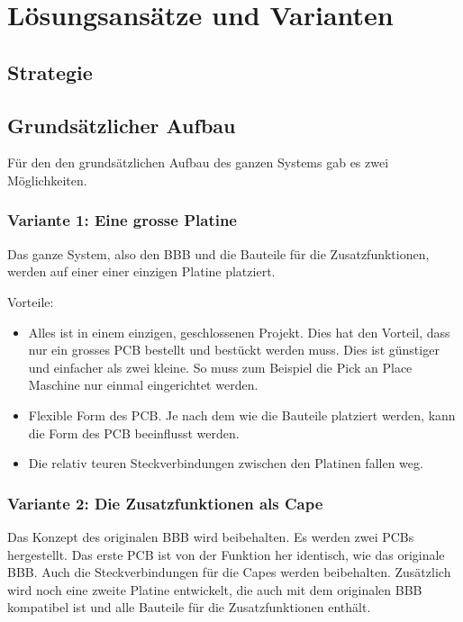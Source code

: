 \chapter{Lösungsansätze und Varianten}


\section{Strategie}



\section{Grundsätzlicher Aufbau}
Für den den grundsätzlichen Aufbau des ganzen Systems gab es zwei Möglichkeiten.

\subsection{Variante 1: Eine grosse Platine}
Das ganze System, also den BBB und die Bauteile für die Zusatzfunktionen, werden auf einer einer einzigen Platine platziert.

Vorteile:
\begin{itemize}
\item Alles ist in einem einzigen, geschlossenen Projekt. Dies hat den Vorteil, dass nur ein grosses PCB bestellt und bestückt werden muss. Dies ist günstiger und einfacher als zwei kleine. So muss zum Beispiel die Pick an Place Maschine nur einmal eingerichtet werden.
\item Flexible Form des PCB. Je nach dem wie die Bauteile platziert werden, kann die Form des PCB beeinflusst werden.
\item Die relativ teuren Steckverbindungen zwischen den Platinen fallen weg.
\end{itemize}

\subsection{Variante 2: Die Zusatzfunktionen als Cape}
Das Konzept des originalen BBB wird beibehalten. Es werden zwei PCBs hergestellt. Das erste PCB ist von der Funktion her identisch, wie das originale BBB. Auch die Steckverbindungen für die Capes werden beibehalten. Zusätzlich wird noch eine zweite Platine entwickelt, die auch mit dem originalen BBB kompatibel ist und alle Bauteile für die Zusatzfunktionen enthält.

